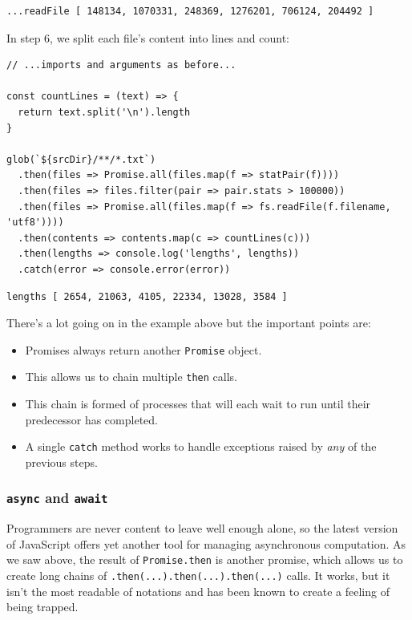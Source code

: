\begin{verbatim}
...readFile [ 148134, 1070331, 248369, 1276201, 706124, 204492 ]
\end{verbatim}

In step 6, we split each file's content into lines and count:

\begin{verbatim}
// ...imports and arguments as before...

const countLines = (text) => {
  return text.split('\n').length
}

glob(`${srcDir}/**/*.txt`)
  .then(files => Promise.all(files.map(f => statPair(f))))
  .then(files => files.filter(pair => pair.stats > 100000))
  .then(files => Promise.all(files.map(f => fs.readFile(f.filename, 'utf8'))))
  .then(contents => contents.map(c => countLines(c)))
  .then(lengths => console.log('lengths', lengths))
  .catch(error => console.error(error))
\end{verbatim}

\begin{verbatim}
lengths [ 2654, 21063, 4105, 22334, 13028, 3584 ]
\end{verbatim}

There's a lot going on in the example above but the important points
are:

\begin{itemize}
\tightlist
\item
  Promises always return another \texttt{Promise} object.
\item
  This allows us to chain multiple \texttt{then} calls.
\item
  This chain is formed of processes that will each wait to run until
  their predecessor has completed.
\item
  A single \texttt{catch} method works to handle exceptions raised by
  \emph{any} of the previous steps.
\end{itemize}

\hypertarget{s:promises-async-await}{\subsubsection{\texorpdfstring{\texttt{async}
and \texttt{await}}{async and await}}\label{s:promises-async-await}}

Programmers are never content to leave well enough alone, so the latest
version of JavaScript offers yet another tool for managing asynchronous
computation. As we saw above, the result of \texttt{Promise.then} is
another promise, which allows us to create long chains of
\texttt{.then(...).then(...).then(...)} calls. It works, but it isn't
the most readable of notations and has been known to create a feeling of
being trapped.

